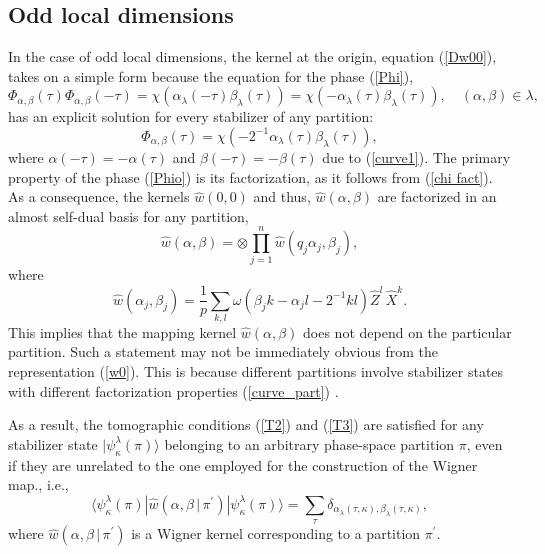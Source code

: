 \documentclass{article}
\begin{document}
\subsection{Odd local dimensions}

In the case of odd local dimensions, the kernel at the origin, equation
(\ref{Dw00}), takes on a simple form because the equation for the phase
(\ref{Phi}),
\begin{equation*}
  \Phi_{\alpha,\beta} (\tau) \Phi_{\alpha,\beta}(-\tau)
  = \chi\left(\alpha_{\lambda}(-\tau)\beta_{\lambda}(\tau)\right)
  = \chi\left(-\alpha_{\lambda}(\tau)\beta_{\lambda}(\tau)\right),
  \quad (\alpha,\beta) \in \lambda,
\end{equation*}
has an explicit solution for every stabilizer of any partition:%
\begin{equation}
  \Phi_{\alpha,\beta}(\tau)
  = \chi\left(
    -2^{-1}\alpha_{\lambda }(\tau) \beta_{\lambda }(\tau)
  \right),
  \label{Phio}
\end{equation}
where $\alpha(-\tau) = -\alpha(\tau)$ and $\beta(-\tau) = -\beta(\tau)$
due to (\ref{curve1}). The primary property of the phase (\ref{Phio}) is its
factorization, as it follows from (\ref{chi fact}). As a consequence, the
kernels $\hat{w}\left(0,0\right)$ and thus, $\hat{w}\left(\alpha,\beta\right)$
are factorized in an almost self-dual basis for any partition,
\begin{equation*}
  \hat{w}\left(\alpha,\beta\right)
  = \otimes \prod \limits_{j=1}^{n} \hat{w}
  \left( q_{j} \alpha_{j}, \beta_{j} \right),
\end{equation*}
where
\begin{equation*}
  \hat{w}(\alpha_{j}, \beta_{j})
  = \frac{1}{p} \sum_{k,l} \omega(\beta_{j} k - \alpha_{j} l -2^{-1} k l)
  \hat{Z}^{l} \,\hat{X}^{k}.
\end{equation*}
This implies that the mapping kernel $\hat{w}\left(\alpha,\beta\right)$ does not
depend on the particular partition. Such a statement may not be immediately
obvious from the representation (\ref{w0}). This is because different partitions
involve stabilizer states with different factorization properties
(\ref{curve_part}) \cite{Bjork2007}.

As a result, the tomographic conditions (\ref{T2}) and (\ref{T3}) are satisfied
for any stabilizer state $|\psi_{\kappa}^{\lambda}(\pi)\rangle$ belonging to an
arbitrary phase-space partition $\pi$, even if they are unrelated to the one
employed for the construction of the Wigner map., i.e.,
\begin{equation*}
  \langle \psi_{\kappa}^{\lambda}(\pi)
  |\hat{w}\left(\alpha,\beta \, | \, \pi^{\prime}\right)
  |\psi_{\kappa}^{\lambda}(\pi)\rangle
  = \sum_{\tau}
  \delta_{\alpha_{\lambda}(\tau,\kappa),\beta_{\lambda}(\tau,\kappa)},
\end{equation*}
where $\hat{w}\left(\alpha,\beta \, | \, \pi^{\prime}\right)$ is a Wigner
kernel corresponding to a partition $\pi^{\prime}$.
\end{document}
